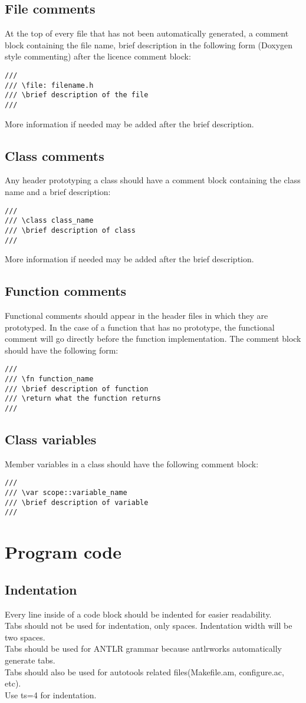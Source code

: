 \documentclass[letterpaper,10pt]{article}
\begin{document}
\subsection{File comments}
At the top of every file that has not been automatically generated, a comment block containing the file name, brief description in the following form (Doxygen style commenting) after the licence comment block:
\begin{verbatim}
///
/// \file: filename.h
/// \brief description of the file
///
\end{verbatim}
More information if needed may be added after the brief description.
\subsection{Class comments}
Any header prototyping a class should have a comment block containing the class name and a brief description:
\begin{verbatim}
///
/// \class class_name
/// \brief description of class
///
\end{verbatim}
More information if needed may be added after the brief description.
\subsection{Function comments}
Functional comments should appear in the header files in which they are prototyped.  In the case of a function that has no prototype, the functional comment will go directly before the function implementation.  The comment block should have the following form:
\begin{verbatim}
///
/// \fn function_name
/// \brief description of function
/// \return what the function returns
///
\end{verbatim}
\subsection{Class variables}
Member variables in a class should have the following comment block:
\begin{verbatim}
///
/// \var scope::variable_name
/// \brief description of variable
///
\end{verbatim}
\section{Program code}
\subsection{Indentation}
Every line inside of a code block should be indented for easier readability.\\
Tabs should not be used for indentation, only spaces.  Indentation width will be two spaces. \\
Tabs should be used for ANTLR grammar because antlrworks automatically generate tabs. \\
Tabs should also be used for autotools related files(Makefile.am, configure.ac, etc). \\
Use ts=4 for indentation.
\end{document}
